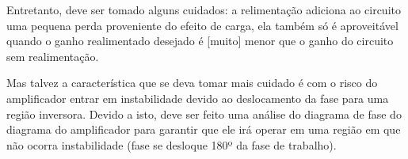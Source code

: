 \documentclass[openright]{normas-utf-tex} %
\begin{document}
Entretanto, deve ser tomado alguns cuidados: a relimentação adiciona ao circuito uma pequena perda proveniente do efeito de carga, ela também só é aproveitável quando o ganho realimentado desejado é [muito] menor que o ganho do circuito sem realimentação. 

Mas talvez a característica que se deva tomar mais cuidado é com o risco do amplificador entrar em instabilidade devido ao deslocamento da fase para uma região inversora. Devido a isto, deve ser feito uma análise do diagrama de fase do diagrama do amplificador  para garantir que ele irá operar em uma região em que não ocorra instabilidade (fase se desloque 180º da fase de trabalho).








% 
%
\end{document}

